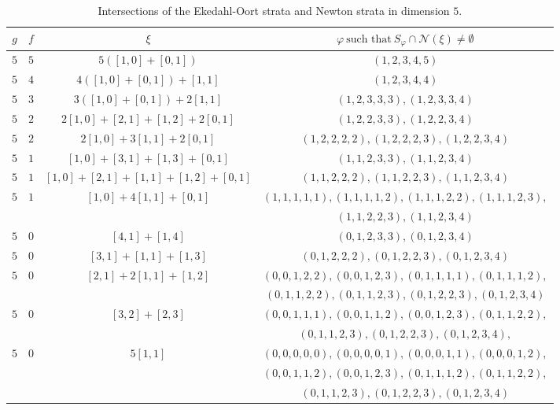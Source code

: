 \documentclass[11pt,table]{amsart}
\numberwithin{equation}{section}
\theoremstyle{definition}
\theoremstyle{remark}
\theoremstyle{remark}
\begin{document}
\begin{table}
    \centering
    \begin{tabular}{|c|c|c|c|}
    \hline
    $g$ & $ f$ & $\xi$ & $ \varphi \ \text{such that} \ S_{\varphi} \cap \mathcal{N}(\xi) \ne \emptyset$ \\
    \hline 
    $5$ & $5$ & $5([1,0] + [0,1]) $ & $(1,2,3,4,5)$  \\
    \hline 
    $5$ & $4$ & $4([1,0] + [0,1]) + [1,1]$ &  $(1,2,3,4,4) $  \\
    \hline 
   $5$ & $3$ & $3([1,0] + [0,1]) + 2[1,1]$ & $(1,2,3,3,3), (1,2,3,3,4)$  \\
   \hline 
   $5$ & $2$ & $2[1,0] + [2,1] + [1,2] + 2[0,1]$ & $(1,2,2,3,3), (1,2,2,3,4) $  \\
    \hline 
    $5$ & $2$ & $2[1,0] + 3[1,1] + 2[0,1]$ & $(1,2,2,2,2), (1,2,2,2,3), (1,2,2,3,4)$   \\
    \hline 
    $5$ & $1$ & $[1,0] + [3,1] + [1,3] + [0,1]$ & $(1,1,2,3,3), (1,1,2,3,4)$  \\
    \hline 
    $5$ & $1$ & $[1,0] + [2,1] + [1,1] + [1,2] + [0,1]$ & $(1,1,2,2,2), (1,1,2,2,3), (1,1,2,3,4) $  \\
    \hline 
    $5$ & $1$ & $[1,0] + 4[1,1] + [0,1]$ & $(1,1,1,1,1),(1,1,1,1,2),(1,1,1,2,2),(1,1,1,2,3), $ \\ & & & $ (1,1,2,2,3), (1,1,2,3,4) $ \\ 
    \hline 
   $5$ & $0$ & $[4,1] + [1,4]$ & $(0,1,2,3,3),(0,1,2,3,4)$  \\
    \hline 
    $5$ & $0$ & $[3,1] + [1,1] + [1,3] $ & $(0,1,2,2,2),(0,1,2,2,3), (0,1,2,3,4)$  \\
    \hline
     $5$ & $0$ & $[2,1] + 2[1,1] + [1,2] $ & $(0,0,1,2,2),(0,0,1,2,3), (0,1,1,1,1), (0,1,1,1,2), $ \\  & & & $ (0,1,1,2,2), (0,1,1,2,3),  (0,1,2,2,3), (0,1,2,3,4) $  \\
     \hline 
     $5$ & $0$ & $[3,2] + [2,3] $ & $(0,0,1,1,1),(0,0,1,1,2),(0,0,1,2,3), (0,1,1,2,2),$ \\ & & &  $ (0,1,1,2,3),     (0,1,2,2,3), (0,1,2,3,4),$  \\
\hline 
$5$ & $0 $ & $5[1,1] $ & $(0,0,0,0,0), (0,0,0,0,1), (0,0,0,1,1),(0,0,0,1,2),$ \\ & & &  $(0,0,1,1,2), (0,0,1,2,3), (0,1,1,1,2), (0,1,1,2,2), $ \\  & & &  $(0,1,1,2,3), (0,1,2,2,3),  (0,1,2,3,4) $  \\
    \hline 

 \end{tabular}
      \caption{Intersections of the Ekedahl-Oort strata and Newton strata in dimension $5$.}
    \label{intstable}
    \end{table}
\end{document}
